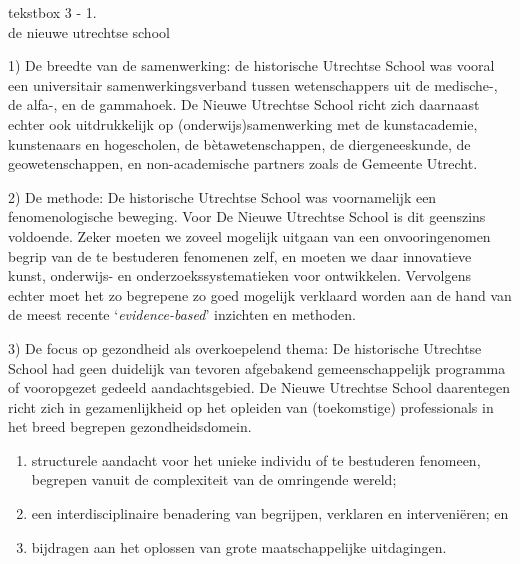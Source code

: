 \documentclass[empirical, authordate, ]{new-jote-article}
\begin{document}
\begin{bookbox}{\raggedright tekstbox 3 - 1. \\de nieuwe utrechtse school}
		1) De breedte van de samenwerking: de historische Utrechtse School was vooral een universitair samenwerkingsverband tussen wetenschappers uit de medische-, de alfa-, en de gammahoek. De Nieuwe Utrechtse School richt zich daarnaast echter ook uitdrukkelijk op (onderwijs)samenwerking met de kunstacademie, kunstenaars en hogescholen, de bètawetenschappen, de diergeneeskunde, de geowetenschappen, en non-academische partners zoals de Gemeente Utrecht.

		\vspace*{\baselineskip}

		2) De methode: De historische Utrechtse School was voornamelijk een fenomenologische beweging. Voor De Nieuwe Utrechtse School is dit geenszins voldoende. Zeker moeten we zoveel mogelijk uitgaan van een onvooringenomen begrip van de te bestuderen fenomenen zelf, en moeten we daar innovatieve kunst, onderwijs- en onderzoekssystematieken voor ontwikkelen. Vervolgens echter moet het zo begrepene zo goed mogelijk verklaard worden aan de hand van de meest recente ‘\emph{evidence-based}' inzichten en methoden.

		\vspace*{\baselineskip}

		3) De focus op gezondheid als overkoepelend thema: De historische Utrechtse School had geen duidelijk van tevoren afgebakend gemeenschappelijk programma of vooropgezet gedeeld aandachtsgebied. De Nieuwe Utrechtse School daarentegen richt zich in gezamenlijkheid op het opleiden van (toekomstige) professionals in het breed begrepen gezondheidsdomein.
	\end{bookbox}
	\begin{enumerate}


		\item structurele aandacht voor het unieke individu of te bestuderen fenomeen, begrepen vanuit de complexiteit van de omringende wereld;



		\item een interdisciplinaire benadering van begrijpen, verklaren en interveniëren; en



		\item bijdragen aan het oplossen van grote maatschappelijke uitdagingen.


	\end{enumerate}
\end{document}
